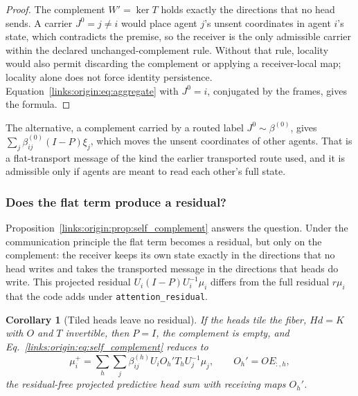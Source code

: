 \documentclass[11pt]{article}
\newtheorem{corollary}[theorem]{Corollary}
\theoremstyle{definition}
\theoremstyle{remark}
\providecommand{\cfg}[1]{{\small\texttt{#1}}}
\begin{document}
\begin{proof}
The complement $W'=\ker T$ holds exactly the directions that no head sends. A carrier $J^0=j\ne i$ would place agent $j$'s unsent coordinates in agent $i$'s state, which contradicts the premise, so the receiver is the only admissible carrier within the declared unchanged-complement rule. Without that rule, locality would also permit discarding the complement or applying a receiver-local map; locality alone does not force identity persistence. Equation~\eqref{links:origin:eq:aggregate} with $J^0=i$, conjugated by the frames, gives the formula.
\end{proof}

The alternative, a complement carried by a routed label $J^0\sim\beta^{(0)}$, gives $\sum_j\beta_{ij}^{(0)}(I-P)\xi_j$, which moves the unsent coordinates of other agents. That is a flat-transport message of the kind the earlier transported route used, and it is admissible only if agents are meant to read each other's full state.

\subsubsection{Does the flat term produce a residual?}

Proposition~\ref{links:origin:prop:self_complement} answers the question. Under the communication principle the flat term becomes a residual, but only on the complement: the receiver keeps its own state exactly in the directions that no head writes and takes the transported message in the directions that heads do write. This projected residual $U_i(I-P)U_i^{-1}\mu_i$ differs from the full residual $r\mu_i$ that the code adds under \cfg{attention\_residual}.

\begin{corollary}[Tiled heads leave no residual]
\label{links:origin:cor:tiled}
If the heads tile the fiber, $Hd=K$ with $O$ and $T$ invertible, then $P=I$, the complement is empty, and Eq.~\eqref{links:origin:eq:self_complement} reduces to
\begin{equation}
\mu_i^+=\sum_h\sum_j\beta_{ij}^{(h)}U_iO_h'T_hU_j^{-1}\mu_j,\qquad O_h'=OE_{:,h},
\label{links:origin:eq:tiled}
\end{equation}
the residual-free projected predictive head sum with receiving maps $O_h'$.
\end{corollary}
\end{document}
